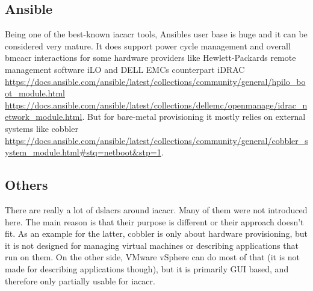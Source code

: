 \subsection{Ansible}
Being one of the best-known \gls{iacacr} tools, Ansibles user base is huge and it can be considered very mature. It does support power cycle management and overall \gls{bmcacr} interactions for some hardware providers like Hewlett-Packards remote management software iLO and DELL EMCs counterpart iDRAC \url{https://docs.ansible.com/ansible/latest/collections/community/general/hpilo_boot_module.html} \url{https://docs.ansible.com/ansible/latest/collections/dellemc/openmanage/idrac_network_module.html}. But for  bare-metal provisioning it mostly relies on external systems like cobbler \url{https://docs.ansible.com/ansible/latest/collections/community/general/cobbler_system_module.html#stq=netboot&stp=1}.

\subsection{Others}
There are really a lot of \gls{dslacr}s around \gls{iacacr}. Many of them were not introduced here. The main reason is that their purpose is different or their approach doesn't fit. As an example for the latter, cobbler is only about hardware provisioning, but it is not designed for managing virtual machines or describing applications that run on them. On the other side, VMware vSphere can do most of that (it is not made for describing applications though), but it is primarily GUI based, and therefore only partially usable for \gls{iacacr}.

